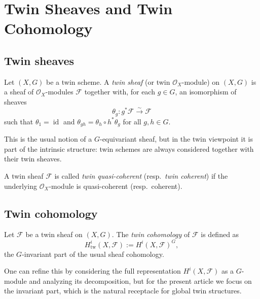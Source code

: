 \documentclass[11pt,a4paper]{article}
\numberwithin{equation}{section}
\DeclareMathOperator{\id}{id}
\newcommand{\TwinScheme}{(X,G)}
\newcommand{\Ocal}{\mathcal{O}}
\newcommand{\Fcal}{\mathcal{F}}
\begin{document}
	\section{Twin Sheaves and Twin Cohomology}
	\label{sec:twin-sheaves}
	
	\subsection{Twin sheaves}
	
	\begin{definition}[Twin $\Ocal_X$-module]
		Let $\TwinScheme$ be a twin scheme.
		A \emph{twin sheaf} (or twin $\Ocal_X$-module) on $\TwinScheme$ is a sheaf of $\Ocal_X$-modules $\Fcal$
		together with, for each $g\in G$, an isomorphism of sheaves
		\[
		\theta_g : g^\ast\Fcal \xrightarrow{\sim} \Fcal
		\]
		such that $\theta_{1}=\id$ and $\theta_{gh}=\theta_h\circ h^\ast\theta_g$ for all $g,h\in G$.
	\end{definition}
	
	\begin{remark}
		This is the usual notion of a $G$-equivariant sheaf, but in the twin viewpoint it is part of the
		intrinsic structure: twin schemes are always considered together with their twin sheaves.
	\end{remark}
	
	\begin{definition}
		A twin sheaf $\Fcal$ is called \emph{twin quasi-coherent} (resp.\ \emph{twin coherent}) if the 
		underlying $\Ocal_X$-module is quasi-coherent (resp.\ coherent).
	\end{definition}
	
	\subsection{Twin cohomology}
	
	\begin{definition}
		Let $\Fcal$ be a twin sheaf on $\TwinScheme$.
		The \emph{twin cohomology} of $\Fcal$ is defined as
		\[
		H^i_{\mathrm{tw}}(X,\Fcal) := H^i(X,\Fcal)^G,
		\]
		the $G$-invariant part of the usual sheaf cohomology.
	\end{definition}
	
	\begin{remark}
		One can refine this by considering the full representation $H^i(X,\Fcal)$ as a $G$-module and
		analyzing its decomposition, but for the present article we focus on the invariant part, which is the
		natural receptacle for global twin structures.
	\end{remark}
	
\end{document}
